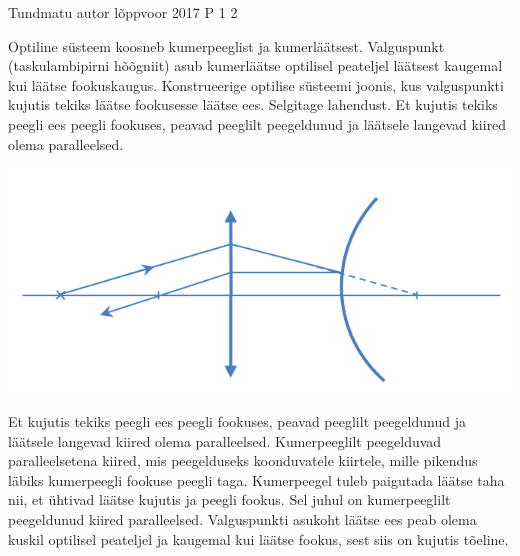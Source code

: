{Tundmatu autor} %
{lõppvoor} %
{2017} %
{P 1} %
{2} %
{
\ifStatement
Optiline süsteem koosneb kumerpeeglist ja kumerläätsest. Valguspunkt (taskulambipirni hõõgniit) asub kumerläätse optilisel peateljel läätsest kaugemal kui läätse fookuskaugus. Konstrueerige optilise süsteemi joonis, kus valguspunkti kujutis tekiks läätse fookusesse läätse ees. Selgitage lahendust.
\fi
\ifHint
Et kujutis tekiks peegli ees peegli fookuses, peavad peeglilt peegeldunud ja läätsele langevad kiired olema paralleelsed.
\fi
\ifSolution
\begin{center}
	\includegraphics[width=0.5\linewidth]{2017-v3p-01-lah.PNG}
\end{center}
Et kujutis tekiks peegli ees peegli fookuses, peavad peeglilt peegeldunud ja läätsele langevad kiired olema paralleelsed. Kumerpeeglilt peegelduvad paralleelsetena kiired, mis peegelduseks koonduvatele kiirtele, mille pikendus läbiks kumerpeegli fookuse peegli taga. Kumerpeegel tuleb paigutada läätse taha nii, et ühtivad läätse kujutis ja peegli fookus. Sel juhul on kumerpeeglilt peegeldunud kiired paralleelsed. Valguspunkti asukoht läätse ees peab olema kuskil optilisel peateljel ja kaugemal kui läätse fookus, sest siis on kujutis tõeline.
\fi
}
